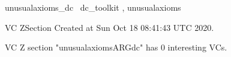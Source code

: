 \documentclass{article}
\begin{document}

\begin{zsection}	 \SECTION unusualaxioms\_dc \parents~dc\_toolkit , unusualaxioms
\end{zsection}

\newcommand{\appliesTo}{\zbinop{appliesTo}} 
\newcommand{\appliesToNofix}{\zpreop{appliesToNofix}} 

VC ZSection Created at Sun Oct 18 08:41:43 UTC 2020.



 VC Z section "unusualaxiomsARGdc" has $0$ interesting VCs.



\end{document}
